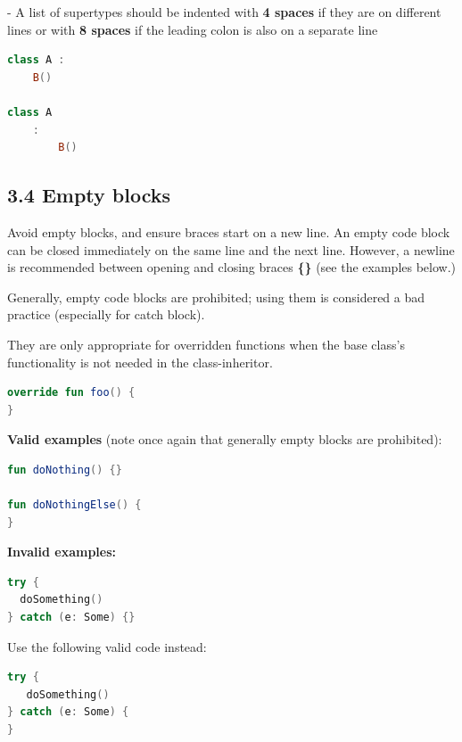 - A list of supertypes should be indented with \textbf{4 spaces} if they are on different lines or with \textbf{8 spaces} if the leading colon is also on a separate line



\begin{lstlisting}[language=Kotlin]
class A :
    B()
    
class A
    :
        B()
\end{lstlisting}


\subsection*{\textbf{3.4 Empty blocks}}

\label{sec:3.4}



Avoid empty blocks, and ensure braces start on a new line. An empty code block can be closed immediately on the same line and the next line. However, a newline is recommended between opening and closing braces \textbf{\{\}} (see the examples below.)



Generally, empty code blocks are prohibited; using them is considered a bad practice (especially for catch block).

They are only appropriate for overridden functions when the base class's functionality is not needed in the class-inheritor.

\begin{lstlisting}[language=Kotlin]
override fun foo() {    
}
\end{lstlisting}


\textbf{Valid examples} (note once again that generally empty blocks are prohibited):



\begin{lstlisting}[language=Kotlin]
fun doNothing() {} 

fun doNothingElse() {
}
\end{lstlisting}


\textbf{Invalid examples:}

\begin{lstlisting}[language=Kotlin]
try {
  doSomething()
} catch (e: Some) {}
\end{lstlisting}


Use the following valid code instead:

\begin{lstlisting}[language=Kotlin]
try {
   doSomething()
} catch (e: Some) {
}
\end{lstlisting}


